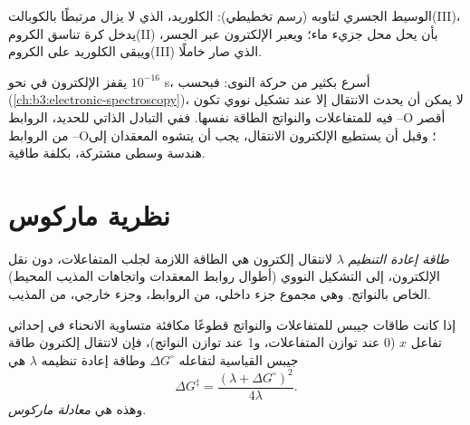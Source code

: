 \begin{omfigure}

{\small الوسيط الجسري لتاوبه (رسم تخطيطي): الكلوريد، الذي لا يزال مرتبطًا
بالكوبالت(III)، يدخل كرة تناسق الكروم(II) بأن يحل محل جزيء
ماء؛ ويعبر الإلكترون عبر الجسر، ويبقى الكلوريد على
الكروم(III) الذي صار خاملًا.}
\end{omfigure}

يقفز الإلكترون في نحو $10^{-16}$ s، أسرع بكثير من حركة النوى: فبحسب
 (\cref{ch:b3:electronic-spectroscopy})، لا يمكن أن يحدث الانتقال
إلا عند تشكيل نووي تكون فيه للمتفاعلات والنواتج
الطاقة نفسها. ففي التبادل الذاتي للحديد، الروابط --O أقصر من
الروابط --O؛ وقبل أن يستطيع الإلكترون الانتقال، يجب أن يتشوه المعقدان إلى
هندسة وسطى مشتركة، بكلفة طاقية.

\section{نظرية ماركوس}

\begin{definition}\label{def:b3:complex-mechanisms:reorganisation}
\emph{طاقة إعادة التنظيم} $\lambda$ لانتقال
إلكترون هي الطاقة اللازمة لجلب المتفاعلات، دون
نقل الإلكترون، إلى التشكيل النووي (أطوال روابط
المعقدات واتجاهات المذيب المحيط) الخاص بالنواتج. وهي
مجموع جزء داخلي، من الروابط، وجزء خارجي، من المذيب.
\end{definition}

\begin{theorem}\label{thm:b3:complex-mechanisms:marcus}
إذا كانت طاقات جيبس للمتفاعلات والنواتج قطوعًا مكافئة متساوية
الانحناء في إحداثي تفاعل $x$ (0 عند توازن المتفاعلات، و1 عند توازن
النواتج)، فإن  لانتقال إلكترون
طاقة جيبس القياسية لتفاعله $\Delta G^\circ$ وطاقة إعادة تنظيمه $\lambda$ هي
\[
  \Delta G^{\ddagger} = \frac{(\lambda + \Delta G^\circ)^2}{4\lambda} .
\]
وهذه هي \emph{معادلة ماركوس}.
\end{theorem}

